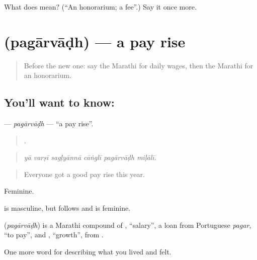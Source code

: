 \begin{tcolorbox}[breakable,colback=teal!4,colframe=teal!35!black,title={Before you move on}]
What does  mean? (\textquotedblleft{}An honorarium; a fee\textquotedblright{}.) Say it once more.
\end{tcolorbox}
\section[\texorpdfstring{\mr{पगारवाढ} (pagārvāḍh)}{पगारवाढ (pagārvāḍh)}]{ (pagārvāḍh) — a pay rise}

\label{lesson:MR-C508-pagarvadh}



\begin{quote}
Before the new one: say the Marathi for daily wages, then the Marathi for an honorarium.
\end{quote}

\subsection*{You'll want to know: }
\textbf{} — \emph{pagārvāḍh} — \textquotedblleft{}a pay rise\textquotedblright{}.

\begin{quote}
     .
\end{quote}

\begin{quote}
\emph{yā varṣī sagḷyānnā cāṅglī pagārvāḍh miḷālī.}
\end{quote}

\begin{quote}
Everyone got a good pay rise this year.
\end{quote}

Feminine.

 is masculine, but  follows  and is feminine.

\begin{cousinweb}
\textbf{} (\emph{pagārvāḍh}) is a Marathi compound of , \textquotedblleft{}salary\textquotedblright{}, a loan from Portuguese \emph{pagar}, \textquotedblleft{}to pay\textquotedblright{}, and , \textquotedblleft{}growth\textquotedblright{}, from .
\end{cousinweb}

\begin{grammarlens}[title={What you've built}]
One more word for describing what you lived and felt.
\end{grammarlens}


